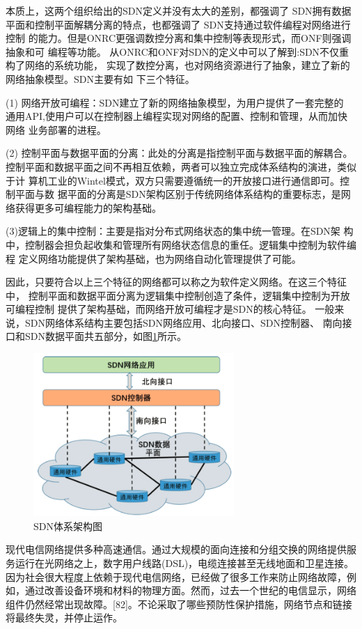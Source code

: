 本质上，这两个组织给出的SDN定义并没有太大的差别，都强调了 SDN拥有数据 平面和控制平面解耦分离的特点，也都强调了 SDN支持通过软件编程对网络进行控制 的能力。但是ONRC更强调数控分离和集中控制等表现形式，而ONF则强调抽象和可 编程等功能。
从ONRC和ONF对SDN的定义中可以了解到:SDN不仅重构了网络的系统功能， 实现了数控分离，也对网络资源进行了抽象，建立了新的网络抽象模型。SDN主要有如 下三个特征。

(1)	网络开放可编程：SDN建立了新的网络抽象模型，为用户提供了一套完整的 通用API,使用户可以在控制器上编程实现对网络的配置、控制和管理，从而加快网络 业务部署的进程。

(2)	控制平面与数据平面的分离：此处的分离是指控制平面与数据平面的解耦合。 控制平面和数据平面之间不再相互依赖，两者可以独立完成体系结构的演进，类似于计 算机工业的Wintel模式，双方只需要遵循统一的开放接口进行通信即可。控制平面与数 据平面的分离是SDN架构区别于传统网络体系结构的重要标志，是网络获得更多可编程能力的架构基础。

(3)逻辑上的集中控制：主要是指对分布式网络状态的集中统一管理。在SDN架 构中，控制器会担负起收集和管理所有网络状态信息的重任。逻辑集中控制为软件编程 定义网络功能提供了架构基础，也为网络自动化管理提供了可能。

因此，只要符合以上三个特征的网络都可以称之为软件定义网络。在这三个特征中， 控制平面和数据平面分离为逻辑集中控制创造了条件，逻辑集中控制为开放可编程控制 提供了架构基础，而网络开放可编程才是SDN的核心特征。
一般来说，SDN网络体系结构主要包括SDN网络应用、北向接口、SDN控制器、 南向接口和SDN数据平面共五部分，如图\ref{fig:SDNArchitectureDiagram}所示。

\begin{figure}[htbp]
\centering
\includegraphics[width=3.0in]{figures/SDNArchitectureDiagram}
  \caption{SDN体系架构图}
  \label{fig:SDNArchitectureDiagram}
\end{figure}

现代电信网络提供多种高速通信。通过大规模的面向连接和分组交换的网络提供服务运行在光网络之上，数字用户线路(DSL)，电缆连接甚至无线地面和卫星连接。因为社会很大程度上依赖于现代电信网络，已经做了很多工作来防止网络故障，例如，通过改善设备环境和材料的物理方面。然而，过去一个世纪的电信显示，网络组件仍然经常出现故障。[82]。不论采取了哪些预防性保护措施，网络节点和链接将最终失灵，并停止运作。





